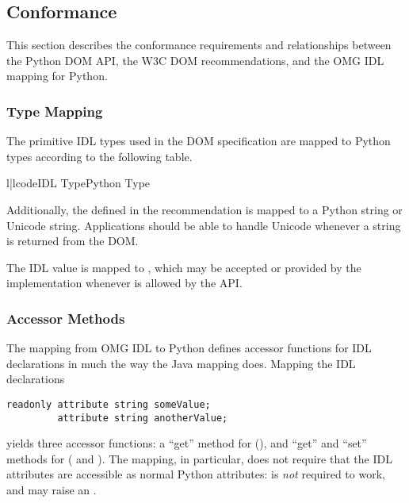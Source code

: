 \subsection{Conformance \label{dom-conformance}}

This section describes the conformance requirements and relationships
between the Python DOM API, the W3C DOM recommendations, and the OMG
IDL mapping for Python.


\subsubsection{Type Mapping \label{dom-type-mapping}}

The primitive IDL types used in the DOM specification are mapped to
Python types according to the following table.

\begin{tableii}{l|l}{code}{IDL Type}{Python Type}
\end{tableii}

Additionally, the  defined in the recommendation is
mapped to a Python string or Unicode string.  Applications should
be able to handle Unicode whenever a string is returned from the DOM.

The IDL  value is mapped to , which may be
accepted or provided by the implementation whenever  is
allowed by the API.


\subsubsection{Accessor Methods \label{dom-accessor-methods}}

The mapping from OMG IDL to Python defines accessor functions for IDL
 declarations in much the way the Java mapping
does.  Mapping the IDL declarations

\begin{verbatim}
readonly attribute string someValue;
         attribute string anotherValue;
\end{verbatim}

yields three accessor functions:  a ``get'' method for
 (), and ``get'' and
``set'' methods for
 ( and
).  The mapping, in particular, does not
require that the IDL attributes are accessible as normal Python
attributes:   is \emph{not} required to
work, and may raise an .

